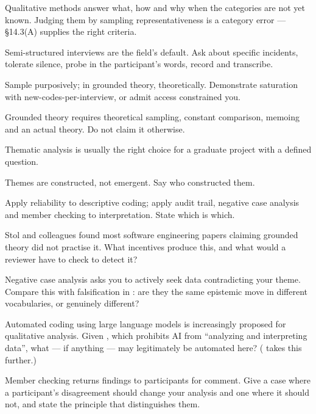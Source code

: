 \begin{chaptersummary}
\begin{tight}
  \item Qualitative methods answer what, how and why when the categories are
    not yet known. Judging them by sampling representativeness is a category
    error --- \S14.3(A) supplies the right criteria.
  \item Semi-structured interviews are the field's default. Ask about specific
    incidents, tolerate silence, probe in the participant's words, record and
    transcribe.
  \item Sample purposively; in grounded theory, theoretically. Demonstrate
    saturation with new-codes-per-interview, or admit access constrained you.
  \item Grounded theory requires theoretical sampling, constant comparison,
    memoing and an actual theory. Do not claim it otherwise.
  \item Thematic analysis is usually the right choice for a graduate project
    with a defined question.
  \item Themes are constructed, not emergent. Say who constructed them.
  \item Apply reliability to descriptive coding; apply audit trail, negative
    case analysis and member checking to interpretation. State which is which.
\end{tight}
\end{chaptersummary}

\begin{reviewq}
  \item Stol and colleagues found most software engineering papers claiming
    grounded theory did not practise it. What incentives produce this, and what
    would a reviewer have to check to detect it?
  \item Negative case analysis asks you to actively seek data contradicting
    your theme. Compare this with falsification in : are they
    the same epistemic move in different vocabularies, or genuinely different?
  \item Automated coding using large language models is increasingly proposed
    for qualitative analysis. Given , which
    prohibits AI from ``analyzing and interpreting data'', what --- if anything
    --- may legitimately be automated here? ( takes this further.)
  \item Member checking returns findings to participants for comment. Give a
    case where a participant's disagreement should change your analysis and one
    where it should not, and state the principle that distinguishes them.
\end{reviewq}
